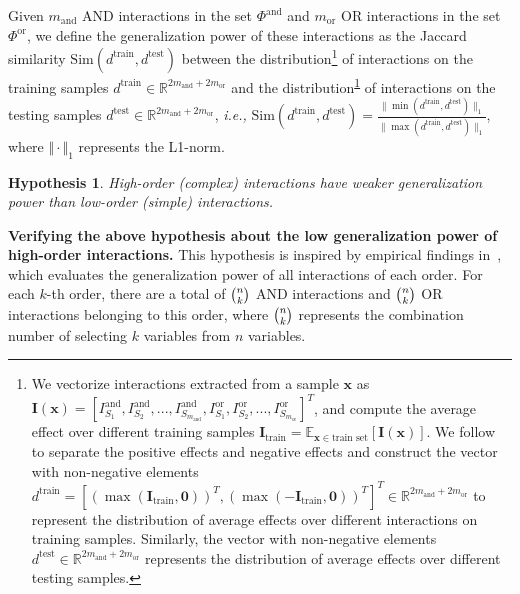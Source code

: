 \documentclass[10pt,twocolumn,letterpaper]{article}
\newtheorem{hypothesis}{Hypothesis}
\begin{document}
\begin{definition}\label{definition::similarity}
    Given \( m_{\text{and}} \) AND interactions in the set \( \Phi^{\text{and}} \) and \( m_{\text{or}} \) OR interactions in the set \( \Phi^{\text{or}} \), we define the generalization power of these interactions as the Jaccard similarity $\text{Sim}(d^{\text{train}}, d^{\text{test}})$ between the distribution\footnote[7]{\label{footnote::similarity}
    We vectorize interactions extracted from a sample $\mathbf{x}$ as $\mathbf{I}(\mathbf{x})= [I^{\text{and}}_{S_1},I^{\text{and}}_{S_2},...,I^{\text{and}}_{S_{m_{\text{and}}}}, I^{\text{or}}_{S_1},I^{\text{or}}_{S_2},...,I^{\text{or}}_{S_{m_{\text{or}}}}]^T$, and compute the average effect over different training samples $\mathbf{I}_{\text{train}}=\mathbb{E}_{\mathbf{x}\in \textrm{train set}}[\mathbf{I}(\mathbf{x})]$. We follow \cite{zhou2024explaining} to separate the positive effects and negative effects and construct the vector with non-negative elements $d^{\text{train}}=\left[(\max(\mathbf{I}_{\text{train}}, \mathbf{0}))^T, (\max(-\mathbf{I}_{\text{train}}, \mathbf{0}))^T\right]^T \in \mathbb{R}^{2m_{\text{and}} + 2m_{\text{or}}}$ to represent the distribution of average effects over different interactions on training samples.
    Similarly, the vector with non-negative elements $d^{\text{test}} \in \mathbb{R}^{2m_{\text{and}} + 2m_{\text{or}}}$ represents the distribution of average effects over different testing samples.} of interactions on the training samples \( d^{\text{train}} \in \mathbb{R}^{2m_{\text{and}} + 2m_{\text{or}}} \) and the distribution\textsuperscript{\ref{footnote::similarity}} of interactions on the testing samples \( d^{\text{test}} \in \mathbb{R}^{2m_{\text{and}} + 2m_{\text{or}}} \), \emph{i.e.,} {$\text{Sim}(d^{\text{train}}, d^{\text{test}}) = \frac{\| \min(d^{\text{train}}, d^{\text{test}}) \|_1} {\| \max(d^{\text{train}}, d^{\text{test}}) \|_1}$}, where \(\Vert\cdot\Vert_1\) represents the L1-norm.
\end{definition}
\vspace{1pt}
\begin{hypothesis}\label{ref::hypothesis1}
    High-order (complex) interactions have weaker generalization power than low-order (simple) interactions.
\end{hypothesis}
\textbf{Verifying the above hypothesis about the low generalization power of high-order interactions.} This hypothesis is inspired by empirical findings in~\citep{zhou2024explaining}, which evaluates the generalization power of all interactions of each order. For each $k$-th order, there are a total of $\tbinom{n}{k}$ AND interactions and $\tbinom{n}{k}$ OR interactions belonging to this order, where $\tbinom{n}{k}$ represents the combination number of selecting $k$ variables from $n$ variables.
\end{document}
